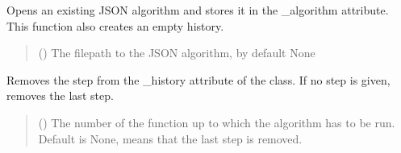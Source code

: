 \documentclass[letterpaper,10pt,english]{sphinxmanual}
\begin{document}
\begin{fulllineitems}

\begin{fulllineitems}
\label{\detokenize{source/_autosummary/HDF5_BLS_analyse.Analyse_backend:HDF5_BLS_analyse.Analyse_backend.silent_open_algorithm}}
\pysigstartsignatures
\pysiglinewithargsret
{}
{\sphinxparamcomma {}}
{}
\pysigstopsignatures
\sphinxAtStartPar
Opens an existing JSON algorithm and stores it in the \_algorithm attribute. This function also creates an empty history.
\begin{quote}\begin{description}
\sphinxAtStartPar
{} (\sphinxstyleliteralemphasis{\sphinxupquote{, }}) \textendash{} The filepath to the JSON algorithm, by default None

\end{description}\end{quote}

\end{fulllineitems}


\begin{fulllineitems}
\label{\detokenize{source/_autosummary/HDF5_BLS_analyse.Analyse_backend:HDF5_BLS_analyse.Analyse_backend.silent_remove_step}}
\pysigstartsignatures
\pysiglinewithargsret
{}
{}
{}
\pysigstopsignatures
\sphinxAtStartPar
Removes the step from the \_history attribute of the class. If no step is given, removes the last step.
\begin{quote}\begin{description}
\sphinxAtStartPar
{} (\sphinxstyleliteralemphasis{\sphinxupquote{, }}) \textendash{} The number of the function up to which the algorithm has to be run. Default is None, means that the last step is removed.


\end{description}
\end{quote}
\end{fulllineitems}
\end{fulllineitems}
\end{document}
